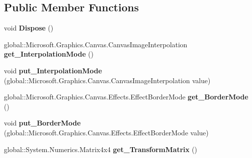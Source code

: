 \subsection*{Public Member Functions}
\begin{DoxyCompactItemize}
\item 
\mbox{\label{class_microsoft_1_1_graphics_1_1_canvas_1_1_effects_1_1_transform3_d_effect_a9623fd7e2c02c46327c72133773725c1}} 
void {\bfseries Dispose} ()
\item 
\mbox{\label{class_microsoft_1_1_graphics_1_1_canvas_1_1_effects_1_1_transform3_d_effect_a92c6d9ac604d9adcc898ee36205ad9bd}} 
global\+::\+Microsoft.\+Graphics.\+Canvas.\+Canvas\+Image\+Interpolation {\bfseries get\+\_\+\+Interpolation\+Mode} ()
\item 
\mbox{\label{class_microsoft_1_1_graphics_1_1_canvas_1_1_effects_1_1_transform3_d_effect_a38d32bf836b68f42f30afd88937f6280}} 
void {\bfseries put\+\_\+\+Interpolation\+Mode} (global\+::\+Microsoft.\+Graphics.\+Canvas.\+Canvas\+Image\+Interpolation value)
\item 
\mbox{\label{class_microsoft_1_1_graphics_1_1_canvas_1_1_effects_1_1_transform3_d_effect_ad947ca8fd0e8f553756452097191b3e9}} 
global\+::\+Microsoft.\+Graphics.\+Canvas.\+Effects.\+Effect\+Border\+Mode {\bfseries get\+\_\+\+Border\+Mode} ()
\item 
\mbox{\label{class_microsoft_1_1_graphics_1_1_canvas_1_1_effects_1_1_transform3_d_effect_a8f41e3d39b88ba94f977519171bf2446}} 
void {\bfseries put\+\_\+\+Border\+Mode} (global\+::\+Microsoft.\+Graphics.\+Canvas.\+Effects.\+Effect\+Border\+Mode value)
\item 
\mbox{\label{class_microsoft_1_1_graphics_1_1_canvas_1_1_effects_1_1_transform3_d_effect_aa80b16ff5d14dca3bcbf428286d5496c}} 
global\+::\+System.\+Numerics.\+Matrix4x4 {\bfseries get\+\_\+\+Transform\+Matrix} ()

\end{DoxyCompactItemize}
